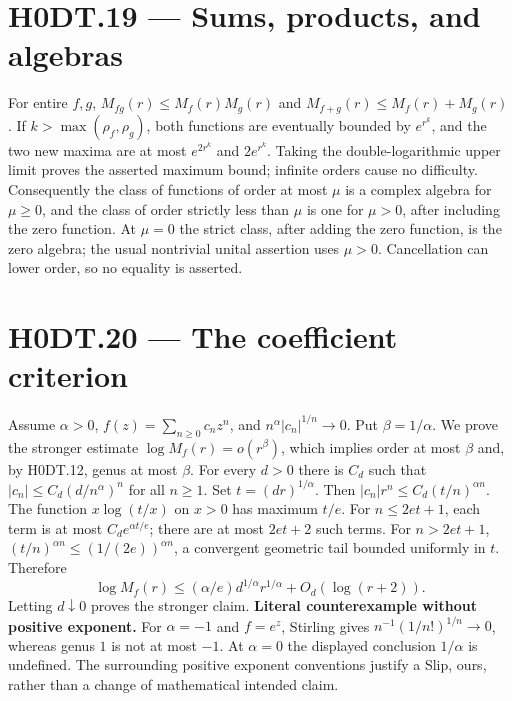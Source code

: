 \section*{H0DT.19 --- Sums, products, and algebras}
For entire $f,g$, $M_{fg}(r)\le M_f(r)M_g(r)$ and $M_{f+g}(r)\le M_f(r)+M_g(r)$. If $k>\max(\rho_f,\rho_g)$, both functions are eventually bounded by $e^{r^k}$, and the two new maxima are at most $e^{2r^k}$ and $2e^{r^k}$. Taking the double-logarithmic upper limit proves the asserted maximum bound; infinite orders cause no difficulty. Consequently the class of functions of order at most $\mu$ is a complex algebra for $\mu\ge0$, and the class of order strictly less than $\mu$ is one for $\mu>0$, after including the zero function. At $\mu=0$ the strict class, after adding the zero function, is the zero algebra; the usual nontrivial unital assertion uses $\mu>0$. Cancellation can lower order, so no equality is asserted.

\section*{H0DT.20 --- The coefficient criterion}
Assume $\alpha>0$, $f(z)=\sum_{n\ge0}c_nz^n$, and $n^\alpha|c_n|^{1/n}\to0$. Put $\beta=1/\alpha$. We prove the stronger estimate $\log M_f(r)=o(r^\beta)$, which implies order at most $\beta$ and, by H0DT.12, genus at most $\beta$.
For every $d>0$ there is $C_d$ such that $|c_n|\le C_d(d/n^\alpha)^n$ for all $n\ge1$. Set $t=(dr)^{1/\alpha}$. Then $|c_n|r^n\le C_d(t/n)^{\alpha n}$. The function $x\log(t/x)$ on $x>0$ has maximum $t/e$. For $n\le2et+1$, each term is at most $C_de^{\alpha t/e}$; there are at most $2et+2$ such terms. For $n>2et+1$, $(t/n)^{\alpha n}\le(1/(2e))^{\alpha n}$, a convergent geometric tail bounded uniformly in $t$. Therefore
\[
 \log M_f(r)\le (\alpha/e)d^{1/\alpha}r^{1/\alpha}+O_d(\log(r+2)).
\]
Letting $d\downarrow0$ proves the stronger claim. \textbf{Literal counterexample without positive exponent.} For $\alpha=-1$ and $f=e^z$, Stirling gives $n^{-1}(1/n!)^{1/n}\to0$, whereas genus $1$ is not at most $-1$. At $\alpha=0$ the displayed conclusion $1/\alpha$ is undefined. The surrounding positive exponent conventions justify a Slip, ours, rather than a change of mathematical intended claim.

